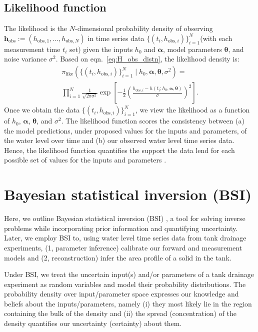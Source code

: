 \documentclass[a4paper,fleqn]{cas-dc}
\newcommand\thedata {$\{(t_i,h_{\text{obs}, i})\}_{i=1}^{N}$\xspace}
\newcommand\thedatanomath {\{(t_i,h_{\text{obs}, i})\}_{i=1}^{N}}
\begin{document}
\subsection{Likelihood function}
The likelihood is the $N$-dimensional probability density of observing $\mathbf{h}_\text{obs}:=(h_{\text{obs},1}, ..., h_{\text{obs},N})$ in time series data \thedata (with each measurement time $t_i$ set) given the inputs $h_0$ and $\boldsymbol \alpha$, model parameters $\boldsymbol \theta$, and noise variance $\sigma^2$. 
Based on eqn.~\ref{eq:H_obs_distn}, the likelihood density is:
\begin{multline}
 \pi_{\text{like}}(\thedatanomath \mid h_0,\boldsymbol  \alpha, \boldsymbol \theta, \sigma^2 ) = \\ \prod_{i=1}^N \frac{1}{\sqrt{2\pi\sigma^2}} \exp \left[-\frac{1}{2}\left(\frac{h_{\text{obs}, i} - h(t_i; h_0, \boldsymbol\alpha, \boldsymbol\theta)}{\sigma} \right)^2 \right]. \label{eq:like}
\end{multline}
Once we obtain the data \thedata, we view the likelihood as a function of $h_0$, $\boldsymbol \alpha$, $\boldsymbol \theta$, and $\sigma^2$.
The likelihood function scores the consistency between (a) the model predictions, under proposed values for the inputs and parameters, of the water level over time and (b) our observed water level time series data. Hence, the likelihood function quantifies the support the data lend for each possible set of values for the inputs and parameters \cite{van2021bayesian}. 

\section{Bayesian statistical inversion (BSI)} \label{sec:bsi}
Here, we outline Bayesian statistical inversion (BSI)  \cite{calvetti2018inverse,waqar2023tutorial,kaipio2006statistical,dashti2013bayesian,allmaras2013estimating}, a tool for solving inverse problems while incorporating prior information and quantifying uncertainty. 
Later, we employ BSI to, using water level time series data from tank drainage experiments,  
(1, parameter inference) calibrate our forward and measurement models and 
(2, reconstruction) infer the area profile of a solid in the tank.

Under BSI, we treat the uncertain input(s) and/or parameters of a tank drainage experiment as random variables and model their probability distributions.
The probability density over input/parameter space expresses our knowledge and beliefs about the inputs/parameters, namely 
(i) they most likely lie in the region containing the bulk of the density and (ii) the spread (concentration) of the density quantifies our uncertainty (certainty) about them. 
\end{document}
